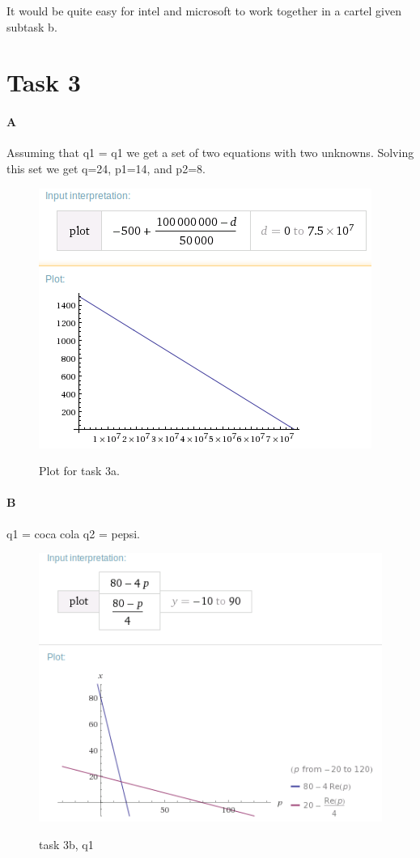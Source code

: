 \documentclass[12pt, a4paper]{article}
\begin{document}
It would be quite easy for intel and microsoft to work together in a cartel
given subtask b.  

\section{Task 3}
\paragraph{A}
Assuming that q1 = q1 we get a set of two equations with two unknowns. Solving
this set we get q=24, p1=14, and p2=8. 
\begin{figure}[htb]
    \centering
    \includegraphics[width=\textwidth]{plot1}
    \label{plot1}
    \caption{}
Plot for task 3a.
\end{figure}

\paragraph{B}
q1 = coca cola
q2 = pepsi. 
\begin{figure}[htb]
    \centering
    \includegraphics[width=\textwidth]{q1}
    \label{q1}
    \caption{}
task 3b, q1
\end{figure}
\end{document}
